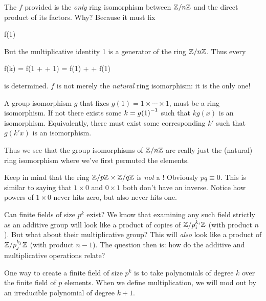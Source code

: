 \begin{remark}
  The $f$ provided is the \emph{only} ring isomorphism between $\mathbb{Z} / n\mathbb{Z}$
  and the direct product of its factors. Why? Because it must fix

  \begin{nedqn}
    f(1)
   \times \cdots {}
  \end{nedqn}

  \noindent
  But the multiplicative identity 1 is a generator of the ring $\mathbb{Z} / n\mathbb{Z}$.
  Thus every

  \begin{nedqn}
    f(k) = f(1 + \cdots + 1) = f(1) + \cdots + f(1)
  \end{nedqn}

  \noindent
  is determined. $f$ is not merely the \emph{natural} ring isomorphism:
  it is the only one!
\end{remark}

\begin{remark}
  A group isomorphism $g$ that fixes $g(1) = 1 \times\cdots\times 1$,
  must be a ring isomorphism. If not there exists some $k = {g(1)}^{-1}$
  such that $k g(x)$ is an isomorphism. Equivalently, there must exist
  some corresponding $k'$ such that $g(k'x)$ is an isomorphism.

  Thus we see that the group isomorphisms of $\mathbb{Z} / n\mathbb{Z}$ are really just
  the (natural) ring isomorphism where we've first permuted the
  elements.
\end{remark}

\begin{remark}
  Keep in mind that the ring $\mathbb{Z} / p\mathbb{Z} \times \mathbb{Z} / q\mathbb{Z}$ is \emph{not} a
  ! Obviously $pq \equiv 0$. This is similar to saying that
  $1 \times 0$ and $0 \times 1$ both don't have an inverse. Notice how
  powers of $1 \times 0$ never hits zero, but also never hits one.

  Can finite fields of size $p^k$ exist? We know that examining any such
  field strictly as an additive group will look like a product of copies
  of $\mathbb{Z} / p_i^{k_i}\mathbb{Z}$ (with product $n$). But what about their
  multiplicative group? This will \emph{also} look like a product of
  $\mathbb{Z} / p_j^{k_j}\mathbb{Z}$ (with product $n-1$). The question then is: how do
  the additive and multiplicative operations relate?

  One way to create a finite field of size $p^k$ is to take polynomials
  of degree $k$ over the finite field of $p$ elements. When we define
  multiplication, we will mod out by an irreducible polynomial of degree
  $k+1$.
\end{remark}
